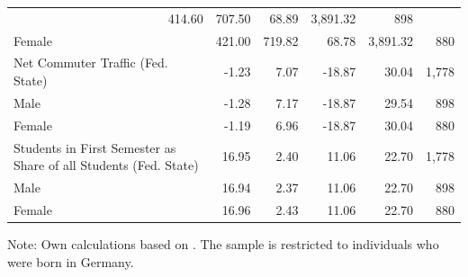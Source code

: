 \documentclass[a4paper, oneside, hyperfootnotes = false]{article}
\begin{document}
{\begin{table}[ht]
\begin{center}
{\begin{tabular}{llllll}
			\multicolumn{1}{r}{414.60} &
			\multicolumn{1}{r}{707.50} &
			\multicolumn{1}{r}{68.89} &
			\multicolumn{1}{r}{3,891.32} &
			\multicolumn{1}{r}{898} \\
			\multicolumn{1}{l}{\hspace{1em}Female} &
			\multicolumn{1}{r}{421.00} &
			\multicolumn{1}{r}{719.82} &
			\multicolumn{1}{r}{68.78} &
			\multicolumn{1}{r}{3,891.32} &
			\multicolumn{1}{r}{880} \\
			\multicolumn{1}{l}{Net Commuter Traffic (Fed. State)} &
			\multicolumn{1}{r}{-1.23} &
			\multicolumn{1}{r}{7.07} &
			\multicolumn{1}{r}{-18.87} &
			\multicolumn{1}{r}{30.04} &
			\multicolumn{1}{r}{1,778} \\
			\multicolumn{1}{l}{\hspace{1em}Male} &
			\multicolumn{1}{r}{-1.28} &
			\multicolumn{1}{r}{7.17} &
			\multicolumn{1}{r}{-18.87} &
			\multicolumn{1}{r}{29.54} &
			\multicolumn{1}{r}{898} \\
			\multicolumn{1}{l}{\hspace{1em}Female} &
			\multicolumn{1}{r}{-1.19} &
			\multicolumn{1}{r}{6.96} &
			\multicolumn{1}{r}{-18.87} &
			\multicolumn{1}{r}{30.04} &
			\multicolumn{1}{r}{880} \\
			\multicolumn{1}{l}{Students in First Semester as Share of all Students (Fed. State)} &
			\multicolumn{1}{r}{16.95} &
			\multicolumn{1}{r}{2.40} &
			\multicolumn{1}{r}{11.06} &
			\multicolumn{1}{r}{22.70} &
			\multicolumn{1}{r}{1,778} \\
			\multicolumn{1}{l}{\hspace{1em}Male} &
			\multicolumn{1}{r}{16.94} &
			\multicolumn{1}{r}{2.37} &
			\multicolumn{1}{r}{11.06} &
			\multicolumn{1}{r}{22.70} &
			\multicolumn{1}{r}{898} \\
			\multicolumn{1}{l}{\hspace{1em}Female} &
			\multicolumn{1}{r}{16.96} &
			\multicolumn{1}{r}{2.43} &
			\multicolumn{1}{r}{11.06} &
			\multicolumn{1}{r}{22.70} &
			\multicolumn{1}{r}{880} \\
			\bottomrule
	\end{tabular}}

\vspace{2mm}

\parbox{15cm}{
	\linespread{1}\footnotesize Note: Own calculations based on \cite{SOEP2023}. The sample is restricted to individuals who were born in Germany.}

\end{center}
\end{table}

}
\end{document}
